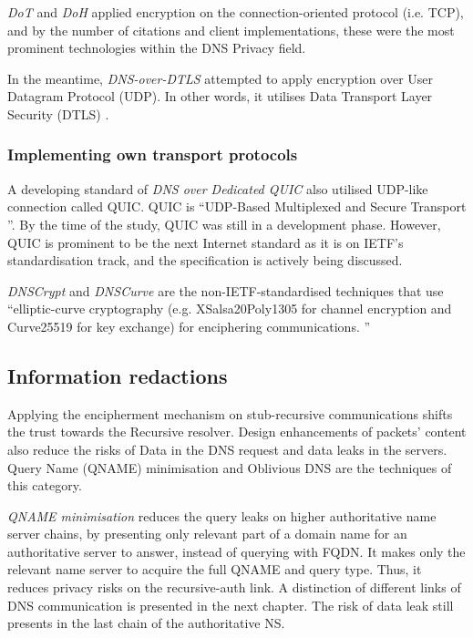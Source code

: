 \textit{DoT} and \textit{DoH} applied encryption on the connection-oriented protocol (i.e. TCP), and by the number of citations and client implementations, these were the most prominent technologies within the DNS Privacy field.

In the meantime, \textit{DNS-over-DTLS} attempted to apply encryption over User Datagram Protocol (UDP). In other words, it utilises Data Transport Layer Security (DTLS) \cite{rfc4347}.

\subsubsection{Implementing own transport protocols}
A developing standard of \textit{DNS over Dedicated QUIC} \cite{dnsoquic} also utilised UDP-like connection called QUIC.
QUIC is ``UDP-Based Multiplexed and Secure Transport \cite{ietf-quic-transport-20}''.
By the time of the study, QUIC was still in a development phase. However, QUIC is prominent to be the next Internet standard as it is on IETF's standardisation  track, and the specification is actively being discussed.

\textit{DNSCrypt} \cite{denis2015dnscrypt} and \textit{DNSCurve} \cite{dempsky2010dnscurve} are the non-IETF-standardised techniques that use ``elliptic-curve cryptography (e.g. XSalsa20Poly1305 \cite{chacha} for channel encryption and Curve25519 for key exchange) for enciphering communications. \cite{van2018privacy}''

\subsection{Information redactions}
Applying the encipherment mechanism on stub-recursive communications shifts the trust towards the Recursive resolver.
Design enhancements of packets' content also reduce the risks of Data in the DNS request and data leaks in the servers.
Query Name (QNAME) minimisation \cite{bortzmeyer2016dns} and Oblivious DNS \cite{annee-dprive-oblivious-dns-00} are the techniques of this category.

\textit{QNAME minimisation} reduces the query leaks on higher authoritative name server chains, by presenting only relevant part of a domain name for an authoritative server to answer, instead of querying with FQDN.
It makes only the relevant name server to acquire the full QNAME and query type. Thus, it reduces privacy risks on the recursive-auth link.
A distinction of different links of DNS communication is presented in the next chapter.
The risk of data leak still presents in the last chain of the authoritative NS.

